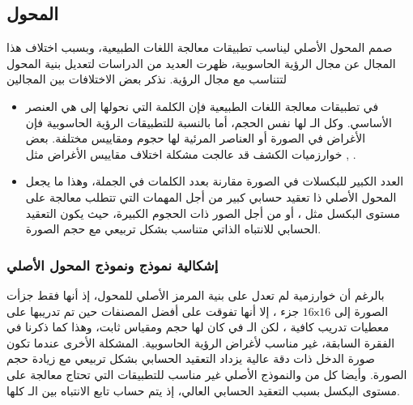 \subsection{المحول 
\label{section:swinTransformer}}
صمم المحول الأصلي ليناسب تطبيقات معالجة اللغات الطبيعية، وبسبب اختلاف هذا المجال عن مجال الرؤية الحاسوبية، ظهرت العديد من الدراسات لتعديل بنية المحول لتتناسب مع مجال الرؤية.
\newline
نذكر بعض الاختلافات بين المجالين
\begin{itemize}
	\item
	في تطبيقات معالجة اللغات الطبيعية فإن الكلمة التي نحولها إلى 
	 هي العنصر الأساسي. وكل الـ
لها نفس الحجم، أما بالنسبة للتطبيقات الرؤية الحاسوبية فإن الأغراض في الصورة أو العناصر المرئية
لها حجوم ومقاييس
مختلفة. بعض خوارزميات الكشف قد عالجت مشكلة اختلاف مقاييس الأغراض مثل
,
.
\item
العدد الكبير للبكسلات في الصورة مقارنة بعدد الكلمات في الجملة، وهذا ما يجعل المحول الأصلي ذا تعقيد حسابي كبير من أجل المهمات التي تتطلب معالجة على مستوى البكسل مثل 
،
أو من أجل الصور ذات الحجوم الكبيرة، حيث يكون التعقيد الحسابي للانتباه الذاتي متناسب بشكل تربيعي مع حجم الصورة.
\end{itemize}
\subsubsection{إشكالية نموذج
ونموذج المحول الأصلي 
}
بالرغم أن خوارزمية
لم تعدل على بنية المرمز الأصلي للمحول، إذ أنها فقط جزأت الصورة إلى
$16 \mathsf{x} 16$
جزء 
،
إلا أنها تفوقت على أفضل المصنفات حين تم تدريبها على معطيات تدريب كافية 
،
لكن الـ 
في
كان لها حجم ومقياس ثابت، وهذا كما ذكرنا في الفقرة السابقة، غير مناسب لأغراض الرؤية الحاسوبية.
المشكلة الأخرى عندما تكون صورة الدخل ذات دقة عالية يزداد التعقيد الحسابي بشكل تربيعي مع زيادة حجم الصورة. وأيضا كل من
والنموذج الأصلي
غير مناسب للتطبيقات التي تحتاج معالجة على مستوى البكسل بسبب التعقيد الحسابي العالي، إذ يتم حساب تابع الانتباه بين الـ
كلها.
